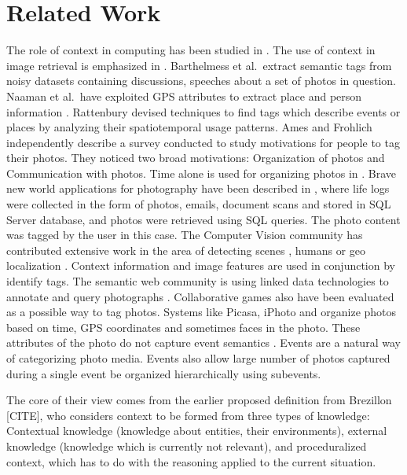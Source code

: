 \chapter{Related Work}

The role of context in computing has been studied in \cite{chen2000survey}. The use of context in image retrieval is emphasized in \cite{jain2010content, datta2008image}. Barthelmess et al.\ extract semantic tags from noisy datasets containing discussions, speeches about a set of photos in question\cite{barthelmess2007toward}. Naaman et al.\ have exploited GPS attributes to extract place and person information \cite{naaman2005leveraging, naaman2005identity}. Rattenbury \cite{rattenbury2009methods} devised techniques to find tags which describe events or places by analyzing their spatiotemporal usage patterns. Ames and Frohlich \cite{ames2007we, frohlich2002requirements} independently describe a survey conducted to study motivations for people to tag their photos. They noticed two broad motivations: Organization of photos and Communication with photos. Time alone is used for organizing photos in \cite{graham2002time, hailpern2011youpivot}. Brave new world applications for photography have been described in \cite{gemmell2002mylifebits, dumais2003stuff}, where life logs were collected in the form of photos, emails, document scans and stored in SQL Server database, and photos were retrieved using SQL queries. The photo content was tagged by the user in this case. The Computer Vision community has contributed extensive work in the area of detecting scenes \cite{xiao2010sun}, humans \cite{dalal2005histograms} or geo localization \cite{hays2008im2gps}. Context information and image features are used in conjunction by \cite{o2009context, cao2008annotating, boutell2005beyond, cao2008eventscene} identify tags. The semantic web community is using linked data technologies to annotate and query photographs \cite{monaghan2006automating, nowack2006confoto}. Collaborative games also have been evaluated as a possible way to tag photos\cite{diakopoulos2007photoplay}. Systems like Picasa, iPhoto and \cite{graham2002time} organize photos based on time, GPS coordinates and sometimes faces in the photo. These attributes of the photo do not capture event semantics \cite{sawant2011automatic}. Events are a natural way of categorizing photo media. Events also allow large number of photos captured during a single event be organized hierarchically using subevents.

The core of their view comes from the earlier proposed definition from Brezillon [CITE], who considers context to be formed from three types of knowledge: Contextual knowledge (knowledge about entities, their environments), external knowledge (knowledge which is currently not relevant), and proceduralized context, which has to do with the reasoning applied to the current situation.

